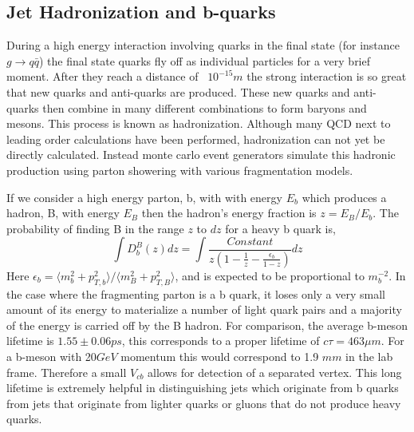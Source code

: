 \subsection{Jet Hadronization and b-quarks}
During a high energy interaction involving quarks in the final state (for instance $g\rightarrow q\bar{q}$)
the final state quarks fly off as individual particles for a very brief moment. After they reach
a distance of ~$10^{-15}m$ the strong interaction is so great that new quarks and anti-quarks
are produced. These new quarks and anti-quarks then combine in many different combinations
to form baryons and mesons. This process is known as hadronization. Although many QCD
next to leading order calculations have been performed, hadronization can not yet be directly calculated.
Instead monte carlo event generators simulate this hadronic production using parton 
showering with various fragmentation models.%

If we consider a high energy parton, b, with with energy $E_{b}$ which produces a hadron, B, with energy $E_{B}$
then the hadron's energy fraction is $z=E_{B}/E_{b}$. The probability of finding B in the range
$z$ to $dz$ for a heavy b quark is,
\begin{equation}
\int{D_{b}^{B}(z)dz}=\int{\frac{Constant}{z(1-\frac{1}{z}-\frac{\epsilon_{b}}{1-z})}dz}
\end{equation}
Here $\epsilon_{b}=\langle m_{b}^{2}+ p_{T,b}^{2} \rangle/\langle m_{B}^{2}+ p_{T,B}^{2} \rangle$, and is expected to be proportional to $m_{b}^{-2}$.
In the case where the fragmenting parton is a b quark, it loses only a very small amount
of its energy to materialize a number of light quark pairs and a majority of the energy is
carried off by the B hadron.  
For comparison, the average b-meson lifetime is $1.55\pm 0.06 ps$, this corresponds to a proper lifetime of
$c\tau=463\mu m$. For a b-meson with 20$GeV$ momentum this would correspond to
1.9 $mm$ in the lab frame. Therefore a small $V_{cb}$ allows for detection of a separated vertex. 
This long lifetime is extremely helpful in distinguishing jets which
originate from b quarks from jets that originate from lighter quarks or gluons that do not produce heavy quarks. 

